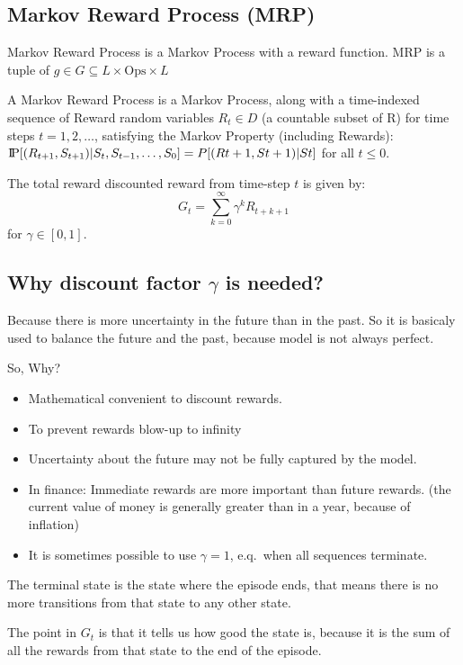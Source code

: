 \begin{itemize}
\section{Markov Reward Process (MRP)}\label{sec:markov-reward-process}
Markov Reward Process is a Markov Process with a reward function.
MRP is a tuple of $g\in G\subseteq L \times \mathrm{Ops} \times L$
\begin{definition}
    A Markov Reward Process is a Markov Process, along with a time-indexed
    sequence of Reward random variables $R_t \in D$ (a countable subset of R) for time steps $t =
    1,2,\ldots$, satisfying the Markov Property (including Rewards):
    $\text{I\kern-0.15em P}[(R_{t+1}, S_{t+1})|S_t, S_{t-1}, \ldots, S_0] = P[(Rt+1, St+1)|St]$ for all $t \leq 0.$~\cite[p.~79]{rao-2022}
\end{definition}

The total reward discounted reward from time-step $t$ is given by:
\[
    G_t = \sum_{k=0}^{\infty} \gamma^k R_{t+k+1}
\]
for $\gamma \in [0,1]$.

\subsection{Why discount factor $\gamma$ is needed?}
Because there is more uncertainty in the future than in the past.
So it is basicaly used to balance the future and the past, because
model is not always perfect.

So, Why?
\begin{itemize}
    \item Mathematical convenient to discount rewards.
    \item To prevent rewards blow-up to infinity
    \item Uncertainty about the future may not be fully captured by the model.
    \item In finance: Immediate rewards are more important than future rewards.
    (the current value of money is generally greater than in a year, because of inflation)
    \item It is sometimes possible to use $\gamma=1$, e.q.\ when all sequences terminate.
\end{itemize}

The terminal state is the state where the episode ends, that means there
is no more transitions from that state to any other state.

The point in $G_t$ is that it tells us how good the state is, because
it is the sum of all the rewards from that state to the end of the episode. %



\end{itemize}
